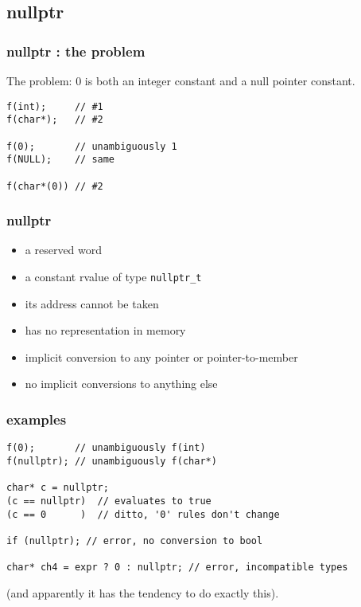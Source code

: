 \subsection{nullptr}
\lyxframeend{}


\begin{frame}[fragile]
\frametitle{nullptr : the problem}

The problem: 0 is both an integer constant and a null pointer
constant.

{\scriptsize
\begin{verbatim}
f(int);     // #1
f(char*);   // #2

f(0);       // unambiguously 1
f(NULL);    // same

f(char*(0)) // #2

\end{verbatim}
}
\end{frame}

\begin{frame}[fragile]
\frametitle{nullptr}

\begin{itemize}
\item a reserved word
\item a constant rvalue of type \texttt{nullptr\_t}
\item its address cannot be taken
\item has no representation in memory
\item implicit conversion to any pointer or pointer-to-member
\item no implicit conversions to anything else
\end{itemize}
\end{frame}
\begin{frame}[fragile]
\frametitle{examples}
{\scriptsize
\begin{verbatim}
f(0);       // unambiguously f(int)
f(nullptr); // unambiguously f(char*)

char* c = nullptr;
(c == nullptr)  // evaluates to true
(c == 0      )  // ditto, '0' rules don't change

if (nullptr); // error, no conversion to bool

char* ch4 = expr ? 0 : nullptr; // error, incompatible types

\end{verbatim}
}


 (and apparently it has the tendency to do exactly this).



\end{frame}
